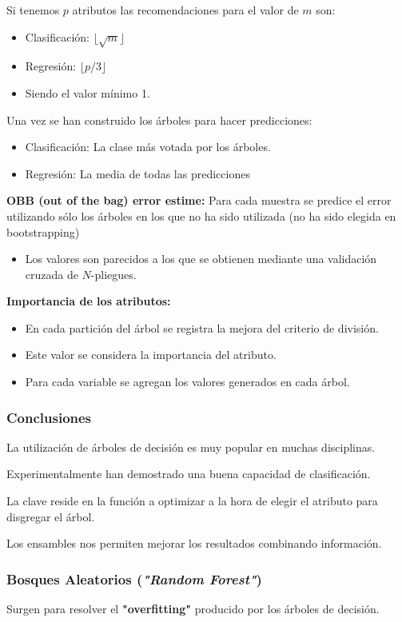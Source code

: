 Si tenemos $p$ atributos las recomendaciones para el valor de $m$ son:
\begin{itemize}
\item Clasificación: $\lfloor\sqrt{m}\rfloor$

\item Regresión: $\lfloor p/3\rfloor$
\item Siendo el valor mínimo 1.
\end{itemize}
Una vez se han construido los árboles para hacer predicciones:
\begin{itemize}
	\item Clasificación: La clase más votada por los árboles.
	\item Regresión: La media de todas las predicciones
\end{itemize}
\textbf{OBB (out of the bag) error estime:} Para cada muestra se predice el error utilizando sólo los árboles en los que no ha sido utilizada (no ha sido elegida en bootstrapping)
\begin{itemize}
	\item Los valores son parecidos a los que se obtienen mediante una validación cruzada de $N$-pliegues.
\end{itemize}
\textbf{Importancia de los atributos:}
\begin{itemize}
	\item En cada partición del árbol se registra la mejora del criterio de división.
	\item Este valor se considera la importancia del atributo.
	\item Para cada variable se agregan los valores generados en cada árbol.
\end{itemize}
\subsubsection{Conclusiones}
La utilización de árboles de decisión es muy popular en muchas disciplinas.

Experimentalmente han demostrado una buena capacidad de clasificación.

La clave reside en la función a optimizar a la hora de elegir el atributo para disgregar el árbol.

Los ensambles nos permiten mejorar los resultados combinando información.
\subsubsection{Bosques Aleatorios (\textit{"Random Forest"})}
Surgen para resolver el \textbf{"overfitting"} producido por los árboles de decisión.


